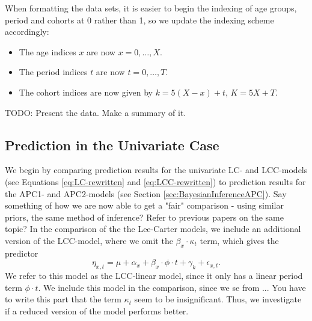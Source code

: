 When formatting the data sets, it is easier to begin the indexing of age groups, period and cohorts at 0 rather than 1, so we update the indexing scheme accordingly:
\begin{itemize}
    \item The age indices $x$ are now $x = 0,\ldots,X$.
    \item The period indices $t$ are now $t = 0, \ldots, T$.
    \item The cohort indices are now given by $k = 5(X - x) + t$, $K = 5X + T$.
\end{itemize}

\textcolor{myDarkGreen}{TODO: Present the data. Make a summary of it. }

\subsection{Prediction in the Univariate Case}
We begin by comparing prediction results for the univariate LC- and LCC-models (see Equations \ref{eq:LC-rewritten} and \ref{eq:LCC-rewritten}) to prediction results for the APC1- and APC2-models (see Section \ref{sec:BayesianInferenceAPC}).
\textcolor{myDarkGreen}{Say something of how we are now able to get a "fair" comparison - using similar priors, the same method of inference? Refer to previous papers on the same topic? }
In the comparison of the the Lee-Carter models, we include an additional version of the LCC-model, where we omit the $\beta_x\cdot \kappa_t$ term, which gives the predictor
\begin{equation}
    \eta_{x,t} = \mu + \alpha_x + \beta_x\cdot \phi \cdot t + \gamma_k + \epsilon_{x,t}.
\end{equation}
We refer to this model as the LCC-linear model, since it only has a linear period term $\phi \cdot t$. We include this model in the comparison, since we se from ... \textcolor{myDarkGreen}{You have to write this part} that the term $\kappa_t$ seem to be insignificant. Thus, we investigate if a reduced version of the model performs better. 

